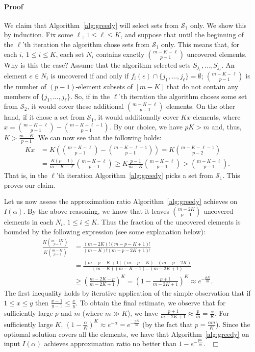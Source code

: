 \documentclass[11pt]{article}
\newenvironment{proof}{\paragraph{Proof}}{\hfill$\Box$\medskip}
\newcommand{\calS}{{{\mathcal{S}}}}
\begin{document}
\begin{proof}
  We claim that Algorithm~\ref{alg:greedy} will select sets from
  $\calS_1$ only. We show this by induction. Fix some $\ell$, $1 \leq
  \ell \leq K$, and suppose that until the beginning of the $\ell$'th
  iteration the algorithm chose sets from $\calS_1$ only.
This means that, for each $i$, $1 \leq i \leq K$, each set $N_i$
  contains exactly ${m-K-\ell \choose p-1}$ uncovered elements. Why is
  this the case? Assume that the algorithm selected sets $S_{j_1},
  \ldots, S_{j_\ell}$. An element $e \in N_i$ is uncovered if and only
  if $f_i(e) \cap \{j_1, \ldots, j_\ell\} = \emptyset$; ${m-K-\ell
    \choose p-1}$ is the number of $(p-1)$-element subsets of $[m-K]$ that
  do not contain any members of $\{j_1, \ldots, j_\ell\}$.  So, if in
  the $\ell$'th iteration the algorithm choses some set from $\calS_2$,
  it would cover these additional ${m-K-\ell \choose p-1}$
  elements. On the other hand, if it chose a set from $\calS_1$, it
  would additionally cover $Kx$ elements, where $x = {m-K-\ell \choose
    p-1} - {m-K-\ell-1 \choose p-1}$.  By our choice, we have $pK > m$
  and, thus, $K > \frac{m-K}{p-1}$. We can now see that the
  following holds:
  \begin{align*}
    Kx &= K\left({m-K-\ell \choose p-1} - {m-K-\ell-1 \choose p-1}\right) 
     = K{m-K-\ell-1 \choose p-2}\\ &= \frac{K(p-1)}{m-K-\ell}{m-K-\ell \choose p-1} 
     \geq K\frac{p-1}{m-K}{m-K-\ell \choose p-1} > {m-K-\ell
      \choose p-1} \textrm{.}
  \end{align*}
  That is, in the $\ell$'th iteration Algorithm~\ref{alg:greedy} picks
  a set from $\calS_1$. This proves our claim.

  Let us now assess the approximation ratio Algorithm~\ref{alg:greedy}
  achieves on $I(\alpha)$. By the above reasoning, we know that it
  leaves ${m-2K \choose p-1}$ uncovered elements in each $N_i$, $1
  \leq i \leq K$.  Thus the fraction of the uncovered elements is
  bounded by the following expression (see some explanation below):
  \begin{align*}
    \frac{K{m-2K \choose p-1}}{K{m - K \choose p-1}} &= \frac{(m-2K)!(m-p-K+1)!}{(m-K)!(m-p-2K+1)!} \\ &= 
    \frac{(m-p-K+1)(m-p-K)\dots(m-p-2K)}{(m-K)(m-K-1)\dots(m-2K+1)} \\ & \geq 
    \left(\frac{m-2K-p}{m-2K+1}\right)^{K} = \left(1 -
      \frac{p+1}{m-2K+1}\right)^{K} \approx e^{-\frac{pK}{m}}
    \textrm{.}
  \end{align*}
  The first inequality holds by iterative application of the simple
  observation that if $1 \leq x \leq y$ then $\frac{x-1}{y-1} \leq
  \frac{x}{y}$.  To obtain the final estimate, we observe that for
  sufficiently large $p$ and $m$ (where $m \gg K$), we have
  $\frac{p+1}{m-2K+1} \approx \frac{p}{m} = \frac{\alpha}{K}$. For
  sufficiently large $K$, $(1 - \frac{\alpha}{K})^K \approx
  e^{-\alpha} = e^{-\frac{pK}{m}}$ (by the fact that $p = \frac{\alpha
    m}{K}$).  Since the optiomal solution covers all the elements, we
  have that Algorithm~\ref{alg:greedy} on input $I(\alpha)$ achieves
  approximation ratio no better than $1-e^{-\frac{pK}{m}}$.~
\end{proof}
\end{document}
